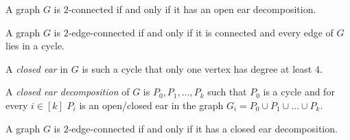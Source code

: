 \begin{theorem}
    A graph $G$ is $2$-connected if and only if it has an open ear decomposition.
\end{theorem}

\begin{proposition}
    A graph $G$ is $2$-edge-connected if and only if it is connected and every edge of $G$ lies in a cycle.
\end{proposition}

\begin{definition}
    A \emph{closed ear} in $G$ is such a cycle that only one vertex has degree at least $4$.
\end{definition}

\begin{definition}
    A \emph{closed ear decomposition} of $G$ is $P_0, P_1, \dots, P_k$ such 
    that $P_0$ is a cycle and for every $i \in [k]$ $P_i$ is an open/closed ear in the graph $G_i = P_0 \cup P_1 \cup \dots \cup P_k$.
\end{definition}

\begin{theorem}
    A graph $G$ is $2$-edge-connected if and only if it has a closed ear decomposition.
\end{theorem}

